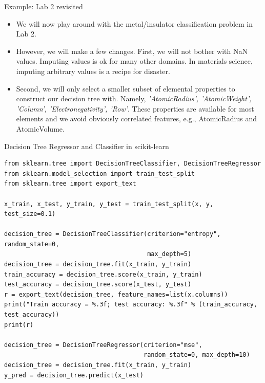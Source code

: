 \documentclass[aspectratio=169]{beamer}
\begin{document}
\begin{frame}{Example: Lab 2 revisited}
    \begin{itemize}
        \item We will now play around with the metal/insulator classification problem in Lab 2.
        \item However, we will make a few changes. First, we will not bother with NaN values. Imputing values is ok for many other domains. In materials science, imputing arbitrary values is a recipe for disaster.
        \item Second, we will only select a smaller subset of elemental properties to construct our decision tree with. Namely, \textit{'AtomicRadius', 'AtomicWeight', 'Column', 'Electronegativity', 'Row'}. These properties are available for most elements and we avoid obviously correlated features, e.g., AtomicRadius and AtomicVolume.
    \end{itemize}
\end{frame}


\begin{frame}[fragile]{Decision Tree Regressor and Classifier in scikit-learn}
\begin{verbatim}
from sklearn.tree import DecisionTreeClassifier, DecisionTreeRegressor
from sklearn.model_selection import train_test_split
from sklearn.tree import export_text

x_train, x_test, y_train, y_test = train_test_split(x, y, test_size=0.1)

decision_tree = DecisionTreeClassifier(criterion="entropy", random_state=0, 
                                       max_depth=5)
decision_tree = decision_tree.fit(x_train, y_train)
train_accuracy = decision_tree.score(x_train, y_train)
test_accuracy = decision_tree.score(x_test, y_test)
r = export_text(decision_tree, feature_names=list(x.columns))
print("Train accuracy = %.3f; test accuracy: %.3f" % (train_accuracy, test_accuracy))
print(r)

decision_tree = DecisionTreeRegressor(criterion="mse", 
                                      random_state=0, max_depth=10)
decision_tree = decision_tree.fit(x_train, y_train)
y_pred = decision_tree.predict(x_test)
\end{verbatim}
\end{frame}
\end{document}
